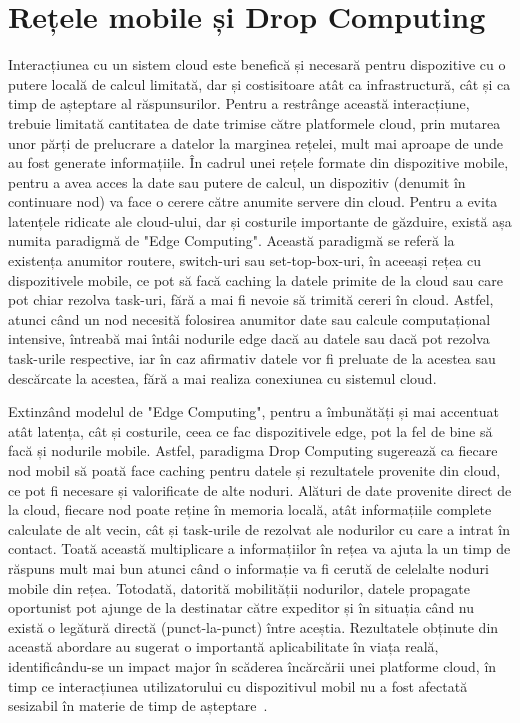 \documentclass[12pt,a4paper]{report}
\begin{document}
\section{Rețele mobile și Drop Computing}
Interacțiunea cu un sistem cloud este benefică și necesară pentru dispozitive cu o putere locală de calcul limitată, dar și costisitoare atât ca infrastructură, cât și ca timp de așteptare al răspunsurilor. Pentru a restrânge această interacțiune, trebuie limitată cantitatea de date trimise către platformele cloud, prin mutarea unor părți de prelucrare a datelor la marginea rețelei, mult mai aproape de unde au fost generate informațiile. În cadrul unei rețele formate din dispozitive mobile, pentru a avea acces la date sau putere de calcul, un dispozitiv (denumit în continuare nod) va face o cerere către anumite servere din cloud. Pentru a evita latențele ridicate ale cloud-ului, dar și costurile importante de găzduire, există așa numita paradigmă de "Edge Computing". Această paradigmă se referă la existența anumitor routere, switch-uri sau set-top-box-uri, în aceeași rețea cu dispozitivele mobile, ce pot să facă caching la datele primite de la cloud sau care pot chiar rezolva task-uri, fără a mai fi nevoie să trimită cereri în cloud. Astfel, atunci când un nod necesită folosirea anumitor date sau calcule computațional intensive, întreabă mai întâi nodurile edge dacă au datele sau dacă pot rezolva task-urile respective, iar în caz afirmativ datele vor fi preluate de la acestea sau descărcate la acestea, fără a mai realiza conexiunea cu sistemul cloud.

Extinzând modelul de "Edge Computing", pentru a îmbunătăți și mai accentuat atât latența, cât și costurile, ceea ce fac dispozitivele edge, pot la fel de bine să facă și nodurile mobile. Astfel, paradigma Drop Computing sugerează ca fiecare nod mobil să poată face caching pentru datele și rezultatele provenite din cloud, ce pot fi necesare și valorificate de alte noduri. Alături de date provenite direct de la cloud, fiecare nod poate reține în memoria locală, atât informațiile complete calculate de alt vecin, cât și task-urile de rezolvat ale nodurilor cu care a intrat în contact. Toată această multiplicare a informațiilor în rețea va ajuta la un timp de răspuns mult mai bun atunci când o informație va fi cerută de celelalte noduri mobile din rețea. Totodată, datorită mobilității nodurilor, datele propagate oportunist pot ajunge de la destinatar către expeditor și în situația când nu există o legătură directă (punct-la-punct) între aceștia. Rezultatele obținute din această abordare au sugerat o importantă aplicabilitate în viața reală, identificându-se un impact major în scăderea încărcării unei platforme cloud, în timp ce interacțiunea utilizatorului cu dispozitivul mobil nu a fost afectată sesizabil în materie de timp de așteptare~\cite{DC}.
\end{document}
